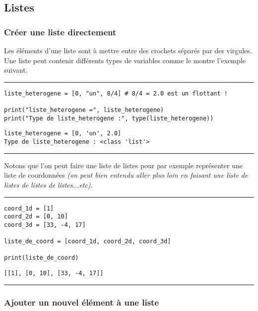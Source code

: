 \subsection{Listes}

\subsubsection{Créer une liste directement}

Les éléments d'une liste sont à mettre entre des crochets séparés par des virgules. Une liste peut contenir différents types de variables comme le montre l'exemple suivant.


\bigskip
{\hrule height .5mm}
\begin{verbatim}
liste_heterogene = [0, "un", 8/4] # 8/4 = 2.0 est un flottant !

print("liste_heterogene =", liste_heterogene)
print("Type de liste_heterogene :", type(liste_heterogene))
\end{verbatim}
 \color{ForestGreen}
\vspace{-1.5em}
\begin{verbatim}
liste_heterogene = [0, 'un', 2.0]
Type de liste_heterogene : <class 'list'>
\end{verbatim} \color{Black}
{\hrule height .5mm}
\bigskip


Notons que l'on peut faire une liste de listes pour par exemple représenter une liste de coordonnées \textit{(on peut bien entendu aller plus loin en faisant une liste de listes de listes de listes...etc)}.

\newpage

\bigskip
{\hrule height .5mm}
\begin{verbatim}
coord_1d = [1]
coord_2d = [0, 10]
coord_3d = [33, -4, 17]

liste_de_coord = [coord_1d, coord_2d, coord_3d]

print(liste_de_coord)
\end{verbatim}
 \color{ForestGreen}
\vspace{-1.5em}
\begin{verbatim}
[[1], [0, 10], [33, -4, 17]]
\end{verbatim} \color{Black}
{\hrule height .5mm}
\bigskip


\subsubsection{Ajouter un nouvel élément à une liste}

